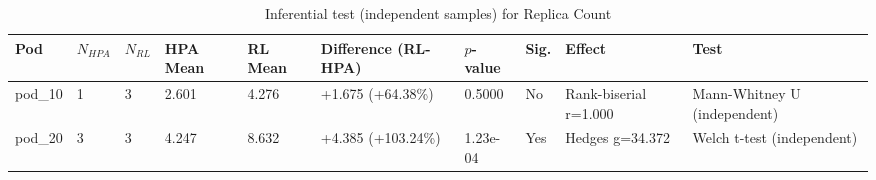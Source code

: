 \begin{table}[ht]
  \centering
  \caption{Inferential test (independent samples) for Replica Count}\label{tab:inferensial-replica}
  \begin{tabular}{llllllllll}
    \toprule
    Pod & $N_{HPA}$ & $N_{RL}$ & HPA Mean & RL Mean & Difference (RL-HPA) & $p$-value & Sig. & Effect & Test \\
    \midrule
    pod\_10 & 1 & 3 & 2.601 & 4.276 & +1.675 (+64.38\%) & 0.5000 & No & Rank-biserial r=1.000 & Mann-Whitney U (independent) \\
    pod\_20 & 3 & 3 & 4.247 & 8.632 & +4.385 (+103.24\%) & 1.23e-04 & Yes & Hedges g=34.372 & Welch t-test (independent) \\
    \bottomrule
  \end{tabular}
\end{table}
